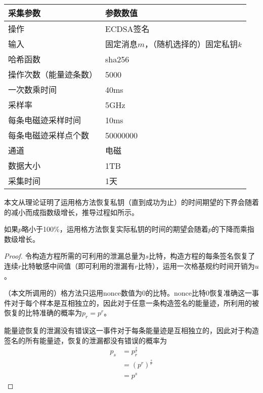 {	\begin{table}[!h]
		\label{tab:acquisitionpara}
		\centering
		\begin{tabular}{ll}                                                               
			\hline   
			采集参数&参数数值\\                                                          
			\hline
			操作 & ECDSA签名\\
			输入 & 固定消息$m$，（随机选择的）固定私钥$k$\\
			哈希函数& sha256\citep{FIPS180-4}\\
			操作次数（能量迹条数） & 5000\\
			一次数乘时间 & 40ms\\
			采样率 & 5GHz\\
			每条电磁迹采样时间 & 10ms\\
			每条电磁迹采样点个数 & 50000000\\
			通道 & 电磁\\
			数据大小 & 1TB\\
			采集时间 & 1天\\
			\hline
		\end{tabular}
	\end{table}

	
	本文从理论证明了运用格方法恢复私钥（直到成功为止）的时间期望的下界会随着\zyx 的减小而成指数级增长，推导过程如所示。
	
	\begin{proposition}\label{prop:expotime}
		如果\zyx$p$略小于100\%，运用格方法恢复实际私钥的时间的期望会随着\zyx$p$的下降而乘指数级增长。
	\end{proposition}
	\begin{proof}
		令构造方程所需的可利用的泄漏总量为$s$比特，构造方程的每条签名恢复了连续$r$比特敏感中间值（即可利用的泄漏有$r$比特），运用一次格基规约时间开销为$u$。
		
		（本文所调用的）格方法只运用nonce数值为0的比特。nonce比特0恢复准确这一事件对于每个样本是互相独立的，因此对于任意一条构造签名的能量迹，所利用的被恢复的比特准确的概率为$p_r=p^r$。
		
		能量迹恢复的泄漏没有错误这一事件对于每条能量迹是互相独立的，因此对于构造签名的所有能量迹，恢复的泄漏都没有错误的概率为\begin{align*}
		p_s&=p_r^{\frac sr}\\
		&=\left(p^r \right) ^{\frac sr}\\
		&=p^s
		\end{align*}
		

\end{proof}}
